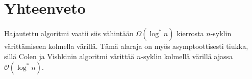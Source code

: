 \documentclass[finnish]{tktltiki2}
\theoremstyle{definition}
\theoremstyle{remark}
\begin{document}
\section{Yhteenveto}

Hajautettu algoritmi vaatii siis vähintään $\Omega(\log^* n)$ kierrosta
$n$-syklin vä\-rit\-tä\-mi\-seen kolmella värillä. Tämä alaraja on myös
asymptoottisesti tiukka, sillä Colen ja Vishkinin algoritmi värittää $n$-syklin
kolmellä värillä ajassa $\mathcal{O}(\log^* n)$.


%
%
% 
%



\end{document}
